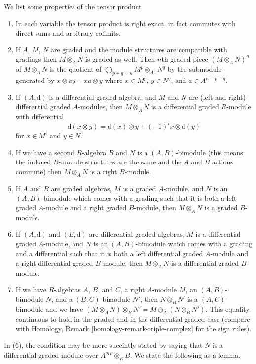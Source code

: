 \medskip\noindent
We list some properties of the tensor product
\begin{enumerate}
\item In each variable the tensor product is right exact, in fact commutes
with direct sums and arbitrary colimits.
\item If $A$, $M$, $N$ are graded and the module structures are compatible
with gradings then $M \otimes_A N$ is graded as well.
Then $n$th graded piece $(M \otimes_A N)^n$ of $M \otimes_A N$
is the quotient of $\bigoplus_{p + q = n} M^p \otimes_{A^0} N^q$
by the submodule generated by $x \otimes ay - xa \otimes y$ where
$x \in M^p$, $y \in N^q$, and $a \in A^{n - p - q}$.
\item If $(A, \text{d})$ is a differential graded algebra, and
$M$ and $N$ are (left and right) differential graded $A$-modules, then
$M \otimes_A N$ is a differential graded $R$-module with differential
$$
\text{d}(x \otimes y) = \text{d}(x) \otimes y + (-1)^ix \otimes \text{d}(y)
$$
for $x \in M^i$ and $y \in N$.
\item If we have a second $R$-algebra $B$ and $N$ is a $(A, B)$-bimodule
(this means: the induced $R$-module structures are the same and
the $A$ and $B$ actions commute) then $M \otimes_A N$ is a right $B$-module.
\item If $A$ and $B$ are graded algebras,
$M$ is a graded $A$-module, and $N$ is an $(A, B)$-bimodule
which comes with a grading such that it is both
a left graded $A$-module and a right graded
$B$-module, then $M \otimes_A N$ is a graded $B$-module.
\item If $(A, \text{d})$ and $(B, \text{d})$ are differential graded algebras,
$M$ is a differential graded $A$-module, and $N$ is an $(A, B)$-bimodule
which comes with a grading and a differential such that it is both
a left differential graded $A$-module and a right differential graded
$B$-module, then $M \otimes_A N$ is a differential graded $B$-module.
\item If we have $R$-algebras $A$, $B$, and $C$, a right $A$-module $M$,
an $(A, B)$-bimodule $N$, and a $(B, C)$-bimodule $N'$, then
$N \otimes_B N'$ is a $(A, C)$-bimodule and we
have $(M \otimes_A N) \otimes_B N' = M \otimes_A (N \otimes_B N')$.
This equality continuous to hold in the graded and in the differential
graded case (compare with
Homology, Remark \ref{homology-remark-triple-complex} for the sign rules).
\end{enumerate}
In (6), the condition may be more succintly stated by saying
that $N$ is a differential graded module over $A^{opp} \otimes_R B$.
We state the following as a lemma.

